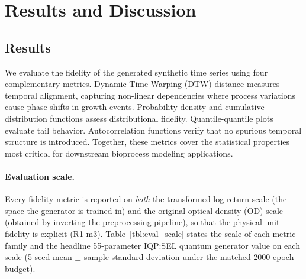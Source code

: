 \documentclass[12pt,twocolumn]{article}
\begin{document}
\section{Results and Discussion}

\subsection{Results}

We evaluate the fidelity of the generated synthetic time series using four complementary metrics. Dynamic Time Warping (DTW) distance measures temporal alignment, capturing non-linear dependencies where process variations cause phase shifts in growth events. Probability density and cumulative distribution functions assess distributional fidelity. Quantile-quantile plots evaluate tail behavior. Autocorrelation functions verify that no spurious temporal structure is introduced. Together, these metrics cover the statistical properties most critical for downstream bioprocess modeling applications.

\paragraph{Evaluation scale.}
Every fidelity metric is reported on \emph{both} the transformed log-return
scale (the space the generator is trained in) and the original optical-density
(OD) scale (obtained by inverting the preprocessing pipeline), so that the
physical-unit fidelity is explicit (R1-m3). Table~\ref{tbl:eval_scale} states
the scale of each metric family and the headline 55-parameter IQP:SEL quantum
generator value on each scale (5-seed mean $\pm$ sample standard deviation under
the matched 2000-epoch budget).
\end{document}
